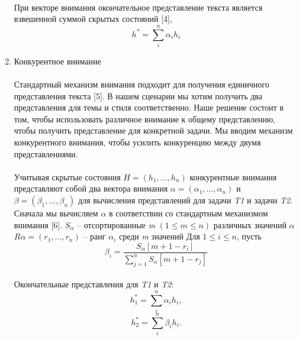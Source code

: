 \documentclass{article}
\begin{document}
\begin{enumerate}[label={\arabic*)}, left=10pt]
\paragraph*{} При векторе внимания окончательное представление текста является взвешенной суммой скрытых состояний [4],
\begin{equation}
    h^{*} = \sum^n_i{\alpha_i h_i}
\end{equation}
\item Конкурентное внимание
\paragraph*{}Стандартный механизм внимания подходит для получения единичного представления текста [5]. В нашем сценарии мы хотим получить два представления для темы 
и стиля соответственно. Наше решение состоит в том, чтобы использовать различное 
внимание к общему представлению, чтобы получить представление для конкретной задачи. Мы вводим механизм конкурентного 
внимания, чтобы усилить конкуренцию 
между двумя представлениями.
\paragraph*{}Учитывая скрытые состояния $\mathit{H} = (h_1, \ldots, h_n)$ конкурентные внимания представляют 
собой два вектора внимания $\alpha = (\alpha_1, \ldots, \alpha_n)$ и $\beta = (\beta_1, \ldots, \beta_n)$ для вычисления представлений для задачи \textit{T1} и задачи \textit{T2}.
Сначала мы вычисляем $\alpha$ в соответствии со стандартным механизмом внимания [6]. $S_\alpha$ – отсортированные \textit{m} $(1 \leq m \leq n)$ различных значений $\alpha$ $R\alpha = (r_1,\ldots,r_n)$ – ранг $\alpha_i$
среди \textit{m} значений  Для $1 \leq i \leq n$, пусть
\begin{equation*}
    \beta_i = \frac{S_{\alpha}[m+1-r_i]}{\sum^n_{j=1}S_{\alpha}[m+1-r_j]}
\end{equation*}
\paragraph*{}Окончательные представления для \textit{T1} и \textit{T2}:
\begin{equation*}
    h^{*}_1 =\sum^n_i{\alpha_i h_i},
\end{equation*}
\begin{equation*}
    h^{*}_2 = \sum^n_i{\beta_i h_i}.
\end{equation*}
\end{enumerate}
\end{document}
